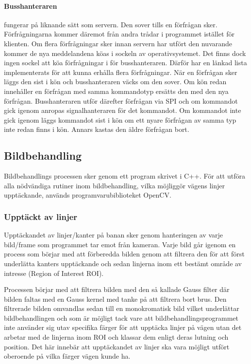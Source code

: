 \documentclass[tekniskrapport/tech.tex]{subfiles}
\begin{document}
\paragraph{Busshanteraren} fungerar på liknande sätt som servern. Den sover
tills en förfrågan sker. Förfrågningarna kommer däremot från andra trådar i
programmet istället för klienten. Om flera förfrågningar sker innan servern har
utfört den nuvarande kommer de nya meddelandena köas i sockeln av
operativsystemet. Det finns dock ingen sockel att köa förfrågningar i för
busshanteraren. Därför har en länkad lista implementerats för att kunna erhålla
flera förfrågningar. När en förfrågan sker läggs den sist i kön och
busshanteraren väcks om den sover. Om kön redan innehåller en förfrågan med
samma kommandotyp ersätts den med den nya förfrågan. Busshanteraren utför
därefter förfrågan via SPI och om kommandot gick igenom anropas
signalhanteraren för det kommandot. Om kommandot inte gick igenom läggs
kommandot sist i kön om ett nyare förfrågan av samma typ inte redan finns i
kön. Annars kastas den äldre förfrågan bort.

\subsection{Bildbehandling}
Bildbehandlings processen sker genom ett program skrivet i C++. För att utföra alla nödvändiga rutiner inom bildbehandling, vilka möjliggör vägens linjer upptäckande, används programvarubiblioteket OpenCV.

\subsubsection{Upptäckt av linjer}
Upptäckandet av linjer/kanter på banan sker genom hanteringen av varje
bild/frame som programmet tar emot från kameran. Varje bild går igenom en
process som börjar med att förberedda bilden genom att filtrera den för att
först underlätta kanters upptäckande och sedan linjerna inom ett bestämt område
av intresse (Region of Interest ROI).

Processen börjar med att filtrera bilden med den så kallade Gauss filter där
bilden faltas med en Gauss kernel med tanke på att filtrera bort brus. Den
filtrerade bilden omvandlas sedan till en monokromatisk bild vilket underlättar
bildbehandlingen och som är möjligt tack vare att bildbehandlingsprogrammet
inte använder sig utav specifika färger för att upptäcka linjer på vägen utan
det arbetar med de linjerna inom ROI och klassar dem enligt deras lutning och
position. Det här innebär att upptäckandet av linjer ska vara möjligt utfört
oberoende på vilka färger vägen kunde ha. 
\end{document}
